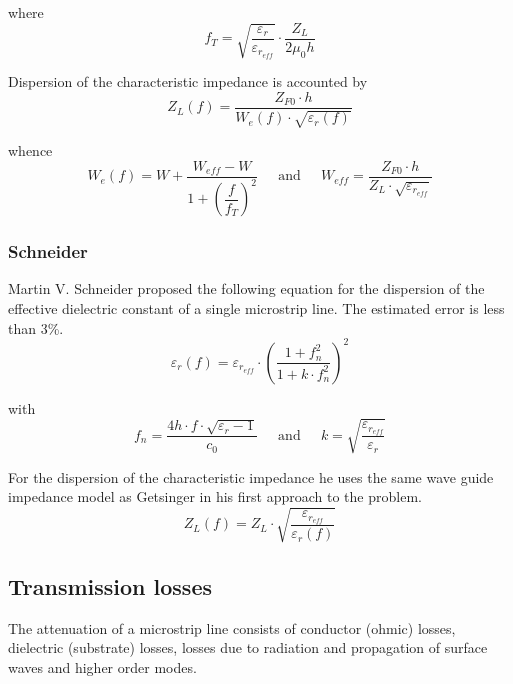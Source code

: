 \documentclass[10pt]{report}
\begin{document}
where
\begin{equation}
f_T = \sqrt{\dfrac{\varepsilon_{r}}{\varepsilon_{r_{eff}}}}\cdot \dfrac{Z_L}{2\mu_0 h}
\end{equation}

Dispersion of the characteristic impedance is accounted by
\begin{equation}
Z_L(f) = \dfrac{Z_{F0}\cdot h}{W_e(f)\cdot \sqrt{\varepsilon_r(f)}}
\end{equation}

whence
\begin{equation}
W_e(f) = W + \dfrac{W_{eff} - W}{1 + \left(\dfrac{f}{f_T}\right)^2}
\;\;\;\; \textrm{ and } \;\;\;\;
W_{eff} = \dfrac{Z_{F0}\cdot h}{Z_L\cdot \sqrt{\varepsilon_{r_{eff}}}}
\end{equation}

\subsubsection{Schneider}

Martin V. Schneider \cite{Schneider1} proposed the following equation
for the dispersion of the effective dielectric constant of a single
microstrip line.  The estimated error is less than 3\%.
\begin{equation}
\varepsilon_r(f) = \varepsilon_{r_{eff}}\cdot \left(\dfrac{1 + f_n^2}{1 + k\cdot f_n^2}\right)^2
\end{equation}

with
\begin{equation}
f_n = \dfrac{4 h \cdot f \cdot \sqrt{\varepsilon_r - 1}}{c_0}
\;\;\;\; \textrm{ and } \;\;\;\;
k = \sqrt{\dfrac{\varepsilon_{r_{eff}}}{\varepsilon_r}}
\end{equation}

For the dispersion of the characteristic impedance he uses the same
wave guide impedance model as Getsinger in his first approach to the
problem.
\begin{equation}
Z_L(f) = Z_L\cdot \sqrt{\dfrac{\varepsilon_{r_{eff}}}{\varepsilon_r(f)}}
\end{equation}

\subsection{Transmission losses}

The attenuation of a microstrip line consists of conductor (ohmic)
losses, dielectric (substrate) losses, losses due to radiation and
propagation of surface waves and higher order modes.
\end{document}
